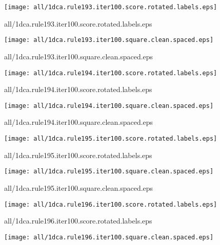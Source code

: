 \documentclass{article}
\begin{document}
\begin{center}
\begin{minipage}{\textwidth}
\texttt{[image: all/1dca.rule193.iter100.score.rotated.labels.eps]}
\end{minipage}
\end{center}
{\footnotesize all/1dca.rule193.iter100.score.rotated.labels.eps}
\begin{center}
\begin{minipage}{\textwidth}
\texttt{[image: all/1dca.rule193.iter100.square.clean.spaced.eps]}
\end{minipage}
\end{center}
{\footnotesize all/1dca.rule193.iter100.square.clean.spaced.eps}
\begin{center}
\begin{minipage}{\textwidth}
\texttt{[image: all/1dca.rule194.iter100.score.rotated.labels.eps]}
\end{minipage}
\end{center}
{\footnotesize all/1dca.rule194.iter100.score.rotated.labels.eps}
\begin{center}
\begin{minipage}{\textwidth}
\texttt{[image: all/1dca.rule194.iter100.square.clean.spaced.eps]}
\end{minipage}
\end{center}
{\footnotesize all/1dca.rule194.iter100.square.clean.spaced.eps}
\begin{center}
\begin{minipage}{\textwidth}
\texttt{[image: all/1dca.rule195.iter100.score.rotated.labels.eps]}
\end{minipage}
\end{center}
{\footnotesize all/1dca.rule195.iter100.score.rotated.labels.eps}
\begin{center}
\begin{minipage}{\textwidth}
\texttt{[image: all/1dca.rule195.iter100.square.clean.spaced.eps]}
\end{minipage}
\end{center}
{\footnotesize all/1dca.rule195.iter100.square.clean.spaced.eps}
\begin{center}
\begin{minipage}{\textwidth}
\texttt{[image: all/1dca.rule196.iter100.score.rotated.labels.eps]}
\end{minipage}
\end{center}
{\footnotesize all/1dca.rule196.iter100.score.rotated.labels.eps}
\begin{center}
\begin{minipage}{\textwidth}
\texttt{[image: all/1dca.rule196.iter100.square.clean.spaced.eps]}
\end{minipage}
\end{center}
\end{document}
